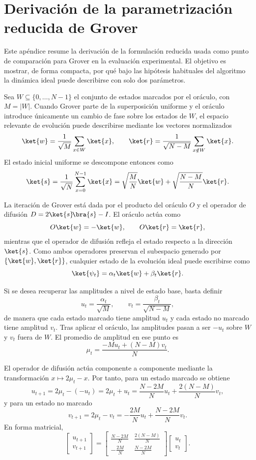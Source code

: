 \section{Derivación de la parametrización reducida de Grover}
\label{ap:grover_reducido}

Este apéndice resume la derivación de la formulación reducida usada como punto de
comparación para Grover en la evaluación experimental. El objetivo es mostrar, de
forma compacta, por qué bajo las hipótesis habituales del algoritmo la dinámica ideal
puede describirse con solo dos parámetros.

Sea $W\subseteq\{0,\dots,N-1\}$ el conjunto de estados marcados por el oráculo, con
$M=|W|$. Cuando Grover parte de la superposición uniforme y el oráculo introduce únicamente
un cambio de fase sobre los estados de $W$, el espacio relevante de evolución puede
describirse mediante los vectores normalizados
\[
\ket{w}=\frac{1}{\sqrt{M}}\sum_{x\in W}\ket{x},
\qquad
\ket{r}=\frac{1}{\sqrt{N-M}}\sum_{x\notin W}\ket{x}.
\]
El estado inicial uniforme se descompone entonces como
\[
\ket{s}
=
\frac{1}{\sqrt{N}}\sum_{x=0}^{N-1}\ket{x}
=
\sqrt{\frac{M}{N}}\ket{w}+\sqrt{\frac{N-M}{N}}\ket{r}.
\]

La iteración de Grover está dada por el producto del oráculo $O$ y el operador de difusión
$D=2\ket{s}\!\bra{s}-I$. El oráculo actúa como
\[
O\ket{w}=-\ket{w},
\qquad
O\ket{r}=\ket{r},
\]
mientras que el operador de difusión refleja el estado respecto a la dirección $\ket{s}$.
Como ambos operadores preservan el subespacio generado por $\{\ket{w},\ket{r}\}$, cualquier
estado de la evolución ideal puede escribirse como
\[
\ket{\psi_t}=\alpha_t\ket{w}+\beta_t\ket{r}.
\]

Si se desea recuperar las amplitudes a nivel de estado base, basta definir
\[
u_t=\frac{\alpha_t}{\sqrt{M}},
\qquad
v_t=\frac{\beta_t}{\sqrt{N-M}},
\]
de manera que cada estado marcado tiene amplitud $u_t$ y cada estado no marcado tiene
amplitud $v_t$. Tras aplicar el oráculo, las amplitudes pasan a ser $-u_t$ sobre $W$ y
$v_t$ fuera de $W$. El promedio de amplitud en ese punto es
\[
\mu_t=\frac{-Mu_t+(N-M)v_t}{N}.
\]

El operador de difusión actúa componente a componente mediante la transformación
$x\mapsto 2\mu_t-x$. Por tanto, para un estado marcado se obtiene
\[
u_{t+1}=2\mu_t-(-u_t)=2\mu_t+u_t
=
\frac{N-2M}{N}u_t+\frac{2(N-M)}{N}v_t,
\]
y para un estado no marcado
\[
v_{t+1}=2\mu_t-v_t
=
-\frac{2M}{N}u_t+\frac{N-2M}{N}v_t.
\]
En forma matricial,
\[
\begin{bmatrix}
u_{t+1} \\
v_{t+1}
\end{bmatrix}
=
\begin{bmatrix}
\frac{N-2M}{N} & \frac{2(N-M)}{N} \\
-\frac{2M}{N} & \frac{N-2M}{N}
\end{bmatrix}
\begin{bmatrix}
u_t \\
v_t
\end{bmatrix}.
\]

